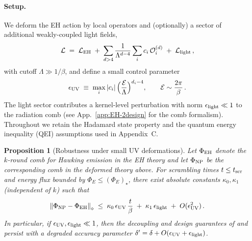 \documentclass[a4paper,11pt]{article}
\newcommand{\Eflux}{\Phi_E}
\newcommand{\Ddiamond}[1]{\left\|#1\right\|_\diamond}
\theoremstyle{plain}
\newtheorem{proposition}{Proposition}
\theoremstyle{definition}
\theoremstyle{remark}
\begin{document}
\paragraph{Setup.} We deform the EH action by local operators and (optionally) a sector of additional weakly-coupled light fields,
\begin{equation}
\mathcal{L} \;=\; \mathcal{L}_{\rm EH} \;+\; \sum_{d>4} \frac{1}{\Lambda^{d-4}} \sum_i c_i\, \mathcal{O}^{(d)}_i \;+\; \mathcal{L}_{\rm light}\,,
\end{equation}
with cutoff $\Lambda \gg 1/\beta$, and define a small control parameter
\begin{equation}
\epsilon_{\rm UV} \;\equiv\; \max_i |c_i| \,\Big(\frac{\mathcal{E}}{\Lambda}\Big)^{d_i-4}, \qquad \mathcal{E}\sim \frac{2\pi}{\beta}\,.
\end{equation}
The light sector contributes a kernel-level perturbation with norm $\epsilon_{\rm light}\ll 1$ to the radiation comb (see App.~\ref{app:EH-2design} for the comb formalism). Throughout we retain the Hadamard state property and the quantum energy inequality (QEI) assumptions used in Appendix~C.

\begin{proposition}[Robustness under small UV deformations]\label{prop:robustness-uv}
Let $\Phi_{\rm EH}$ denote the $k$-round comb for Hawking emission in the EH theory and let $\Phi_{\rm NP}$ be the corresponding comb in the deformed theory above. For scrambling times $t\le t_{\rm scr}$ and energy flux bounded by $\Eflux\le (\Eflux)_\star$, there exist absolute constants $\kappa_0,\kappa_1$ (independent of $k$) such that
\begin{equation}
\Ddiamond{\Phi_{\rm NP}-\Phi_{\rm EH}} \;\le\; \kappa_0\,\epsilon_{\rm UV}\,\frac{t}{\beta}\;+\;\kappa_1\,\epsilon_{\rm light}\;+\;O(\epsilon_{\rm UV}^2)\,.
\end{equation}
In particular, if $\epsilon_{\rm UV},\epsilon_{\rm light}\ll 1$, then the decoupling and design guarantees of  and  persist with a degraded accuracy parameter $\delta'=\delta+O(\epsilon_{\rm UV}+\epsilon_{\rm light})$.
\end{proposition}
\end{document}
